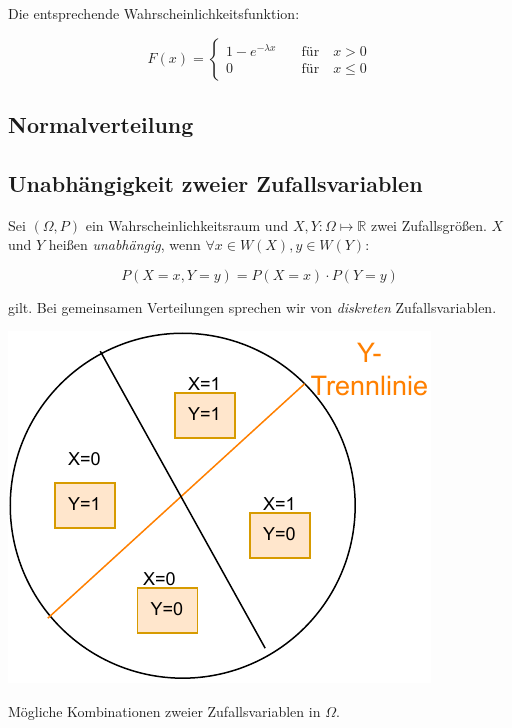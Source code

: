 \documentclass{tufte-handout}
\theoremstyle{own}
\begin{document}
Die entsprechende Wahrscheinlichkeitsfunktion:

\begin{equation}
F(x) = \begin{cases}
1 - e^{- \lambda x} \hspace{1em} & \text{für} \hspace{1em} x >0 \\
0 \hspace{1em} & \text{für} \hspace{1em} x \leq 0
\end{cases}
\end{equation}

\subsection{Normalverteilung}

\subsection{Unabhängigkeit zweier Zufallsvariablen}

Sei $(\Omega, P)$ ein Wahrscheinlichkeitsraum und $X,Y : \Omega \mapsto \mathbb{R}$ zwei Zufallsgrößen.
$X$ und $Y$ heißen \textit{unabhängig}, wenn $\forall x \in W(X), y \in W(Y)$:

\begin{equation}
	P(X=x, Y=y) = P(X=x) \cdot P(Y=y)
\end{equation}

gilt. Bei gemeinsamen Verteilungen sprechen wir von \textit{diskreten} Zufallsvariablen.

\begin{marginfigure}
  \includegraphics{zweizufallsvariablen}
  \caption{Mögliche Kombinationen zweier Zufallsvariablen in $\Omega$.}
\end{marginfigure}
\end{document}
